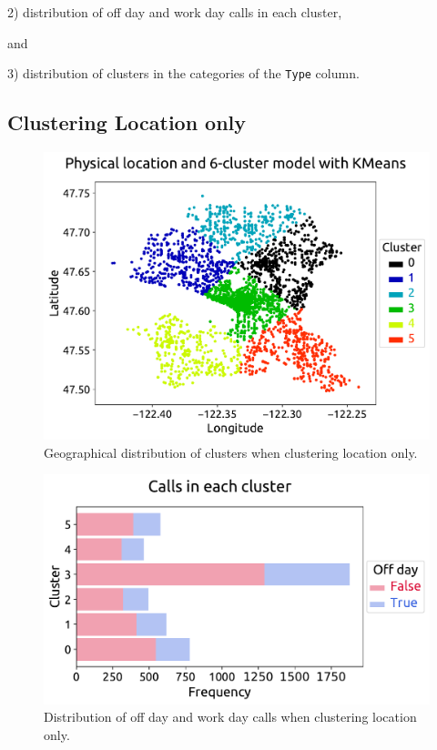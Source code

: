 \documentclass[12pt,a4paper]{article}
\begin{document}
2) distribution of off day and work day calls in each cluster,

and

3) distribution of clusters in the categories of the \verb|Type| column.

\clearpage

\subsection{Clustering Location only}

\begin{figure}[ht!]
\centering
\includegraphics[scale=0.6]{figs/STORY_loc_location.pdf}
\caption{Geographical distribution of clusters when clustering location only.}
\label{STORY_loc_location}
\end{figure}

\begin{figure}[ht!]
\centering
\includegraphics[scale=0.6]{figs/STORY_loc_off_days.pdf}
\caption{Distribution of off day and work day calls when clustering location only.}
\label{STORY_loc_off_days}
\end{figure}
\end{document}
